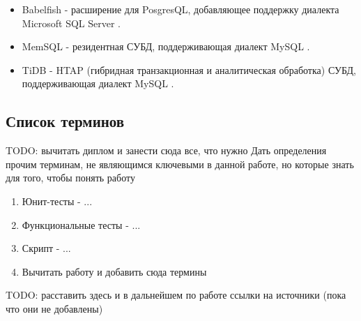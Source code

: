 \begin{itemize}
    \item Babelfish - расширение для PosgresQL, добавляющее поддержку диалекта Microsoft SQL Server \cite{babelfish}.
    \item MemSQL - резидентная СУБД, поддерживающая диалект MySQL \cite{memsql}.
    \item TiDB - HTAP (гибридная транзакционная и аналитическая обработка) СУБД, поддерживающая диалект MySQL \cite{tidb}.
\end{itemize}

\subsection{Список терминов}
TODO: вычитать диплом и занести сюда все, что нужно
Дать определения прочим терминам, не являющимся ключевыми в данной работе, но которые знать для того, чтобы понять работу
\begin{enumerate}
    \item Юнит-тесты - ...
    \item Функциональные тесты - ...
    \item Скрипт - ...
    \item Вычитать работу и добавить сюда термины
\end{enumerate}

TODO: расставить здесь и в дальнейшем по работе ссылки на источники (пока что они не добавлены)
